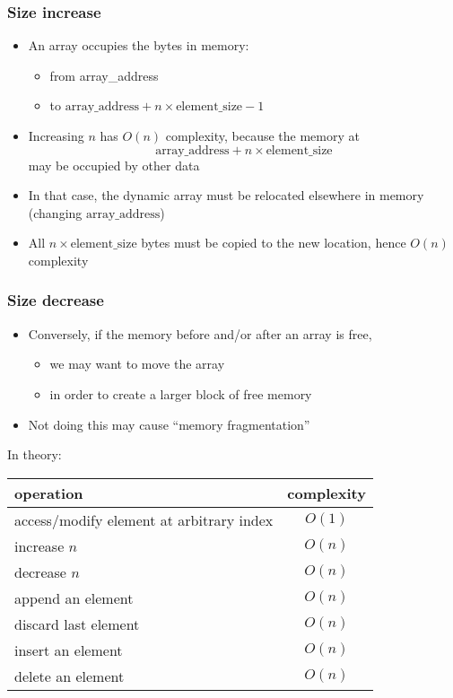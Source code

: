 \documentclass[12pt]{article}
\begin{document}
\subsubsection{Size increase}

\begin{itemize}
  \item An array occupies the bytes in memory:
  \begin{itemize}
    \item from array\_address
    \item to \( \text{array\_address} + n \times \text{element\_size} - 1 \)
  \end{itemize}
  \item Increasing \( n \) has \( O(n) \) complexity, because the memory at
  \[ \text{array\_address} + n \times \text{element\_size} \]
  may be occupied by other data
  \item In that case, the dynamic array must be relocated elsewhere in memory (changing \( \text{array\_address} \))
  \item All \( n \times \text{element\_size} \) bytes must be copied to the new location, hence \( O(n) \) complexity
\end{itemize}




\subsubsection{Size decrease}

\begin{itemize}
    \item Conversely, if the memory before and/or after an array is free,
    \begin{itemize}
        \item we may want to move the array
        \item in order to create a larger block of free memory
    \end{itemize}
    \item Not doing this may cause ``memory fragmentation''
\end{itemize}

\noindent In theory:

\begin{center}
\begin{tabular}{l c}
\hline
operation & complexity \\
\hline
access/modify element at arbitrary index & $O(1)$ \\
increase $n$ & $O(n)$ \\
decrease $n$ & $O(n)$ \\
append an element & $O(n)$ \\
discard last element & $O(n)$ \\
insert an element & $O(n)$ \\
delete an element & $O(n)$ \\
\hline
\end{tabular}
\end{center}
\end{document}
